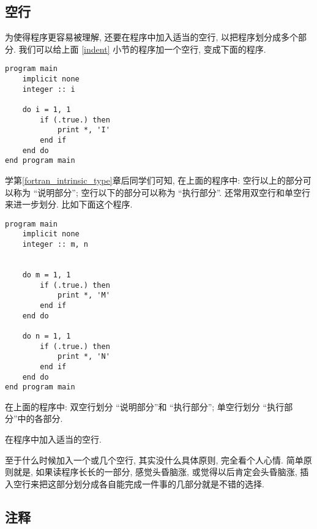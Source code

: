 \subsection{空行}\label{empty_line}

为使得程序更容易被理解, 还要在程序中加入适当的空行, 以把程序划分成多个部分. 我们可以给上面 \ref{indent} 小节的程序加一个空行, 变成下面的程序.
\begin{lstlisting}
program main
    implicit none
    integer :: i

    do i = 1, 1
        if (.true.) then
            print *, 'I'
        end if
    end do
end program main
\end{lstlisting}
学第\ref{fortran_intrinsic_type}章后同学们可知, 在上面的程序中: 空行以上的部分可以称为 ``说明部分''; 空行以下的部分可以称为 ``执行部分''. 还常用双空行和单空行来进一步划分. 比如下面这个程序.
\begin{lstlisting}
program main
    implicit none
    integer :: m, n


    do m = 1, 1
        if (.true.) then
            print *, 'M'
        end if
    end do

    do n = 1, 1
        if (.true.) then
            print *, 'N'
        end if
    end do
end program main
\end{lstlisting}
在上面的程序中: 双空行划分 ``说明部分''和 ``执行部分''; 单空行划分 ``执行部分''中的各部分.
\begin{convention}
    在程序中加入适当的空行.
\end{convention}
至于什么时候加入一个或几个空行, 其实没什么具体原则, 完全看个人心情. 简单原则就是, 如果读程序长长的一部分, 感觉头昏脑涨, 或觉得以后肯定会头昏脑涨, 插入空行来把这部分划分成各自能完成一件事的几部分就是不错的选择.

\subsection{注释}

